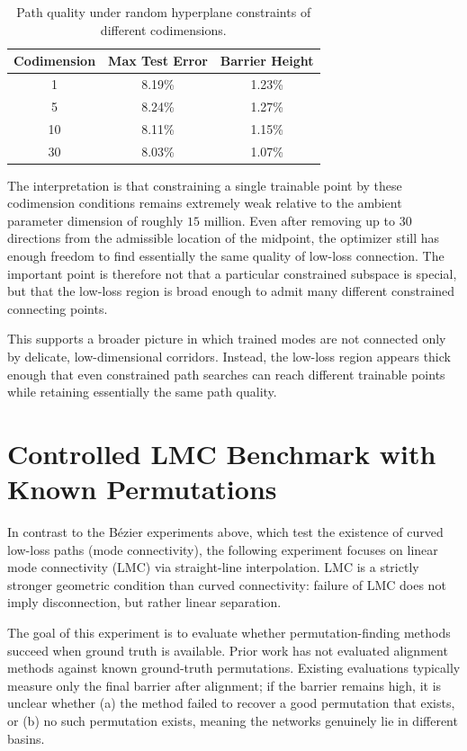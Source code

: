 \documentclass[11pt,a4paper]{report}
\begin{document}
\begin{table}[H]
    \centering
    \label{tab:random_plane_codim_results}
    \begin{tabular}{ccc}
        \toprule
        \textbf{Codimension} & \textbf{Max Test Error} & \textbf{Barrier Height} \\
        \midrule
        1 & 8.19\% & 1.23\% \\
        5 & 8.24\% & 1.27\% \\
        10 & 8.11\% & 1.15\% \\
        30 & 8.03\% & 1.07\% \\
        \bottomrule
    \end{tabular}
    \caption{Path quality under random hyperplane constraints of different codimensions.}
\end{table}

The interpretation is that constraining a single trainable point by these codimension conditions remains extremely weak relative to the ambient parameter dimension of roughly $15$ million. Even after removing up to $30$ directions from the admissible location of the midpoint, the optimizer still has enough freedom to find essentially the same quality of low-loss connection. The important point is therefore not that a particular constrained subspace is special, but that the low-loss region is broad enough to admit many different constrained connecting points.

This supports a broader picture in which trained modes are not connected only by delicate, low-dimensional corridors. Instead, the low-loss region appears thick enough that even constrained path searches can reach different trainable points while retaining essentially the same path quality.

\section{Controlled LMC Benchmark with Known Permutations}
\label{sec:controlled_benchmark}

In contrast to the Bézier experiments above, which test the existence of curved low-loss paths (mode connectivity), the following experiment focuses on linear mode connectivity (LMC) via straight-line interpolation. LMC is a strictly stronger geometric condition than curved connectivity: failure of LMC does not imply disconnection, but rather linear separation.

The goal of this experiment is to evaluate whether permutation-finding methods succeed when ground truth is available. Prior work has not evaluated alignment methods against known ground-truth permutations. Existing evaluations typically measure only the final barrier after alignment; if the barrier remains high, it is unclear whether (a) the method failed to recover a good permutation that exists, or (b) no such permutation exists, meaning the networks genuinely lie in different basins.
\end{document}
